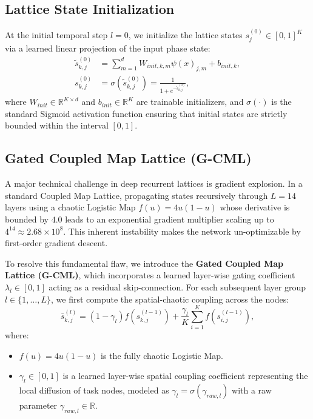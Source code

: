 \subsection{Lattice State Initialization}
At the initial temporal step $l = 0$, we initialize the lattice states $s_j^{(0)} \in [0, 1]^K$ via a learned linear projection of the input phase state:
\begin{align}
\tilde{s}_{k, j}^{(0)} &= \sum_{m=1}^d W_{init, k, m} \psi(x)_{j, m} + b_{init, k}, \\
s_{k, j}^{(0)} &= \sigma\left(\tilde{s}_{k, j}^{(0)}\right) = \frac{1}{1 + e^{-\tilde{s}_{k, j}^{(0)}}},
\end{align}
where $W_{init} \in \mathbb{R}^{K \times d}$ and $b_{init} \in \mathbb{R}^K$ are trainable initializers, and $\sigma(\cdot)$ is the standard Sigmoid activation function ensuring that initial states are strictly bounded within the interval $[0, 1]$.

\subsection{Gated Coupled Map Lattice (G-CML)}
A major technical challenge in deep recurrent lattices is gradient explosion. In a standard Coupled Map Lattice, propagating states recursively through $L=14$ layers using a chaotic Logistic Map $f(u) = 4u(1-u)$ whose derivative is bounded by $4.0$ leads to an exponential gradient multiplier scaling up to $4^{14} \approx 2.68 \times 10^8$. This inherent instability makes the network un-optimizable by first-order gradient descent.

To resolve this fundamental flaw, we introduce the \textbf{Gated Coupled Map Lattice (G-CML)}, which incorporates a learned layer-wise gating coefficient $\lambda_l \in [0, 1]$ acting as a residual skip-connection.
For each subsequent layer group $l \in \{1, \dots, L\}$, we first compute the spatial-chaotic coupling across the nodes:
\begin{equation}
\bar{s}_{k, j}^{(l)} = (1 - \gamma_l) f\left(s_{k, j}^{(l-1)}\right) + \frac{\gamma_l}{K} \sum_{i=1}^K f\left(s_{i, j}^{(l-1)}\right),
\end{equation}
where:
\begin{itemize}
    \item $f(u) = 4u(1-u)$ is the fully chaotic Logistic Map.
    \item $\gamma_l \in [0, 1]$ is a learned layer-wise spatial coupling coefficient representing the local diffusion of task nodes, modeled as $\gamma_l = \sigma(\gamma_{raw, l})$ with a raw parameter $\gamma_{raw, l} \in \mathbb{R}$.
\end{itemize}

